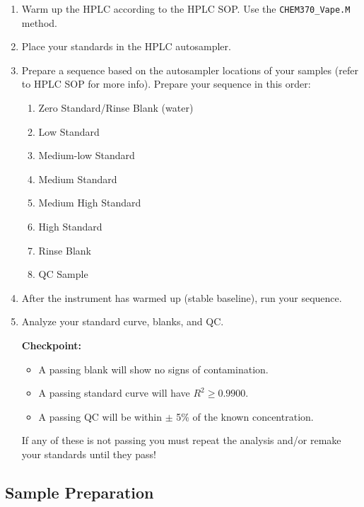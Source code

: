 \documentclass[]{tufte-book}
\providecommand{\tightlist}{%
  \setlength{\itemsep}{0pt}\setlength{\parskip}{0pt}}
\begin{document}
\begin{enumerate}
\def\labelenumi{\arabic{enumi}.}
\item
  Warm up the HPLC according to the HPLC SOP. Use the \texttt{CHEM370\_Vape.M} method.
\item
  Place your standards in the HPLC autosampler.
\item
  Prepare a sequence based on the autosampler locations of your samples (refer to HPLC SOP for more info). Prepare your sequence in this order:

  \begin{enumerate}
  \def\labelenumii{\arabic{enumii}.}
  \tightlist
  \item
    Zero Standard/Rinse Blank (water)
  \item
    Low Standard
  \item
    Medium-low Standard
  \item
    Medium Standard
  \item
    Medium High Standard
  \item
    High Standard
  \item
    Rinse Blank
  \item
    QC Sample
  \end{enumerate}
\item
  After the instrument has warmed up (stable baseline), run your sequence.
\item
  Analyze your standard curve, blanks, and QC.

  \begin{marginfigure}
   \textbf{Checkpoint:}

   \begin{itemize}
   \tightlist
   \item
     A passing blank will show no signs of contamination.\\
   \item
     A passing standard curve will have \(R^2 \ge 0.9900\).\\
   \item
     A passing QC will be within \(\pm\) 5\% of the known concentration.
   \end{itemize}

   If any of these is not passing you must repeat the analysis and/or
   remake your standards until they pass!
   \end{marginfigure}
\end{enumerate}

\hypertarget{sample-preparation-1}{%
\subsection{Sample Preparation}\label{sample-preparation-1}}
\end{document}
